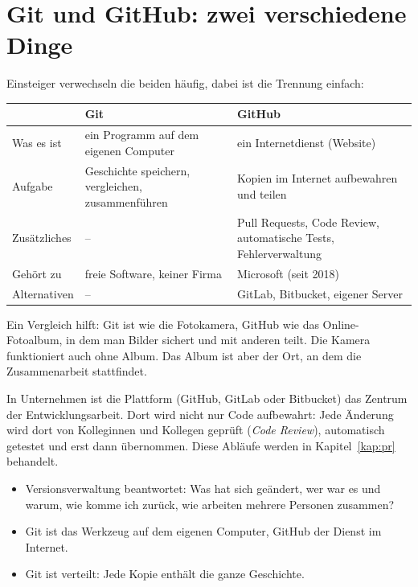\section{Git und GitHub: zwei verschiedene Dinge}

Einsteiger verwechseln die beiden häufig, dabei ist die Trennung einfach:

\begin{center}
\renewcommand{\arraystretch}{1.35}
\begin{tabularx}{\linewidth}{@{}l>{\raggedright\arraybackslash}X>{\raggedright\arraybackslash}X@{}}
  \toprule
                     & \textbf{Git} & \textbf{GitHub} \\
  \midrule
  Was es ist         & ein Programm auf dem eigenen Computer & ein Internetdienst (Website) \\
  Aufgabe            & Geschichte speichern, vergleichen, zusammenführen & Kopien im Internet aufbewahren und teilen \\
  Zusätzliches       & –  & Pull Requests, Code Review, automatische Tests, Fehlerverwaltung \\
  Gehört zu          & freie Software, keiner Firma & Microsoft (seit 2018) \\
  Alternativen       & –  & GitLab, Bitbucket, eigener Server \\
  \bottomrule
\end{tabularx}
\end{center}

Ein Vergleich hilft: Git ist wie die Fotokamera, GitHub wie das Online-Fotoalbum, in dem
man Bilder sichert und mit anderen teilt. Die Kamera funktioniert auch ohne Album. Das Album
ist aber der Ort, an dem die Zusammenarbeit stattfindet.

\begin{praxis}
In Unternehmen ist die Plattform (GitHub, GitLab oder Bitbucket) das Zentrum der
Entwicklungsarbeit. Dort wird nicht nur Code aufbewahrt: Jede Änderung wird dort von
Kolleginnen und Kollegen geprüft (\emph{Code Review}), automatisch getestet und erst dann
übernommen. Diese Abläufe werden in Kapitel~\ref{kap:pr} behandelt.
\end{praxis}

\begin{zusammenfassung}
\begin{itemize}[nosep]
  \item Versionsverwaltung beantwortet: Was hat sich geändert, wer war es und warum,
        wie komme ich zurück, wie arbeiten mehrere Personen zusammen?
  \item Git ist das Werkzeug auf dem eigenen Computer, GitHub der Dienst im Internet.
  \item Git ist verteilt: Jede Kopie enthält die ganze Geschichte.
\end{itemize}
\end{zusammenfassung}
